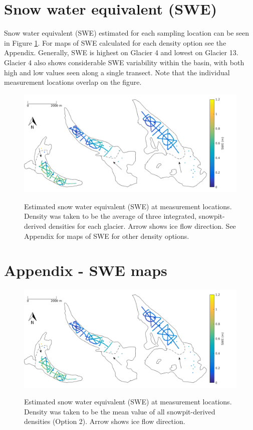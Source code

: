 \documentclass[12pt]{article}
\begin{document}
\pagebreak
\section{Snow water equivalent (SWE)}

Snow water equivalent (SWE) estimated for each sampling location can be seen in Figure \ref{SWEmaps}. For maps of SWE calculated for each density option see the Appendix. Generally, SWE is highest on Glacier 4 and lowest on Glacier 13. Glacier 4 also shows considerable SWE variability within the basin, with both high and low values seen along a single transect. Note that the individual measurement locations overlap on the figure.


\begin{landscape}
\begin{figure}
	\centering
	\includegraphics[width = 23 cm]{SWEmap_opt8.png}\\
	\caption{Estimated snow water equivalent (SWE) at measurement locations. Density was taken to be the average of three integrated, snowpit-derived densities for each glacier. Arrow shows ice flow direction. See Appendix for maps of SWE for other density options.}
	\label{SWEmaps}
\end{figure}

\end{landscape}


\pagebreak
\section*{Appendix - SWE maps}

\begin{figure}[H]
	\centering
	\includegraphics[width = \textwidth]{SWEmap_opt2.png}\\
	\caption{Estimated snow water equivalent (SWE) at measurement locations. Density was taken to be the mean value of all snowpit-derived densities (Option 2). Arrow shows ice flow direction.}
\end{figure}
\end{document}
